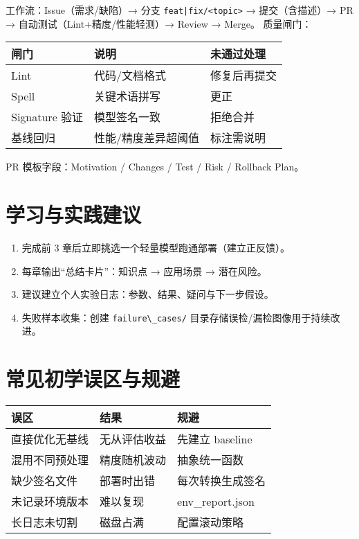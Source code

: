 工作流：Issue（需求/缺陷）→ 分支
\passthrough{\lstinline!feat|fix/<topic>!} → 提交（含描述）→ PR →
自动测试（Lint+精度/性能轻测）→ Review → Merge。 质量闸门：

\begin{longtable}[]{@{}lll@{}}
\toprule\noalign{}
闸门 & 说明 & 未通过处理 \\
\midrule\noalign{}
\endhead
\bottomrule\noalign{}
\endlastfoot
Lint & 代码/文档格式 & 修复后再提交 \\
Spell & 关键术语拼写 & 更正 \\
Signature 验证 & 模型签名一致 & 拒绝合并 \\
基线回归 & 性能/精度差异超阈值 & 标注需说明 \\
\end{longtable}

PR 模板字段：Motivation / Changes / Test / Risk / Rollback Plan。

\section{学习与实践建议}\label{ux5b66ux4e60ux4e0eux5b9eux8df5ux5efaux8bae}

\begin{enumerate}
\def\labelenumi{\arabic{enumi}.}
\tightlist
\item
  完成前 3 章后立即挑选一个轻量模型跑通部署（建立正反馈）。
\item
  每章输出``总结卡片''：知识点 → 应用场景 → 潜在风险。
\item
  建议建立个人实验日志：参数、结果、疑问与下一步假设。
\item
  失败样本收集：创建 \passthrough{\lstinline!failure\_cases/!}
  目录存储误检/漏检图像用于持续改进。
\end{enumerate}

\section{常见初学误区与规避}\label{ux5e38ux89c1ux521dux5b66ux8befux533aux4e0eux89c4ux907f}

\begin{longtable}[]{@{}lll@{}}
\toprule\noalign{}
误区 & 结果 & 规避 \\
\midrule\noalign{}
\endhead
\bottomrule\noalign{}
\endlastfoot
直接优化无基线 & 无从评估收益 & 先建立 baseline \\
混用不同预处理 & 精度随机波动 & 抽象统一函数 \\
缺少签名文件 & 部署时出错 & 每次转换生成签名 \\
未记录环境版本 & 难以复现 & env\_report.json \\
长日志未切割 & 磁盘占满 & 配置滚动策略 \\
\end{longtable}

